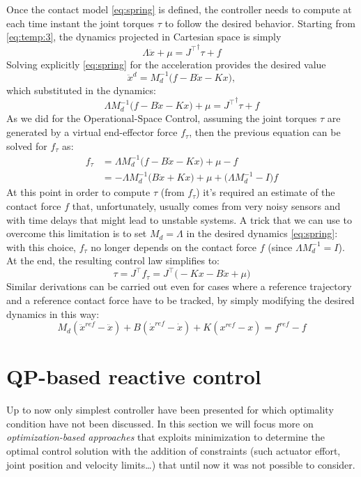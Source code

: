 	Once the contact model \eqref{eq:spring} is defined, the controller needs to compute at each time instant the joint torques $\tau$ to follow the desired behavior. 
	Starting from \eqref{eq:temp:3}, the dynamics projected in Cartesian space is simply 
	$$
	\Lambda \ddot x + \mu = {J^\top}^\dagger \tau + f
	$$
	Solving explicitly \eqref{eq:spring} for the acceleration provides the desired value 
	$$
	\ddot x^d = M_d^{-1}\big(f-B\dot x - Kx\big),
	$$ 
	which substituted in the dynamics:
	\[ \Lambda M_d^{-1}\big(f - B\dot x - K x\big) + \mu = {J^\top}^\dagger \tau + f \]
	As we did for the Operational-Space Control, assuming the joint torques $\tau$ are generated by a virtual end-effector force $f_\tau$, then the previous equation can be solved for $f_\tau$ as:
	\begin{align*}
		f_\tau & = \Lambda M_d ^{-1} \big( f - B\dot x - Kx \big) + \mu - f \\
		& = -\Lambda M_d^{-1}\big(B\dot x + K x\big) + \mu + \big(\Lambda M_d^{-1} - I\big) f
	\end{align*}
	At this point in order to compute $\tau$ (from $f_\tau$) it's required an estimate of the contact force $f$ that, unfortunately, usually comes from very noisy sensors and with time delays that might lead to unstable systems. A trick that we can use to overcome this limitation is to set $M_d = \Lambda$ in the desired dynamics \eqref{eq:spring}: with this choice, $f_\tau$ no longer depends on the contact force $f$ (since $\Lambda M_d^{-1} = I$). 
	At the end, the resulting control law simplifies to:
	\begin{equation}
		\tau = J^\top f_\tau = J^\top \big(-Kx - B\dot x + \mu\big)
	\end{equation}
	Similar derivations can be carried out even for cases where a reference trajectory and a reference contact force have to be tracked, by simply modifying the desired dynamics in this way:
	\begin{equation} \label{eq:spring}
		M_d (\ddot x^{ref} - \ddot x) + B (\dot x^{ref} - \dot x) + K (x^{ref} - x) = f^{ref} - f
	\end{equation}
	
\section{QP-based reactive control}
	Up to now only simplest controller have been presented for which optimality condition have not been discussed. In this section we will focus more on \textit{optimization-based approaches} that exploits minimization to determine the optimal control solution with the addition of constraints (such actuator effort, joint position and velocity limits\dots) that until now it was not possible to consider.
	
